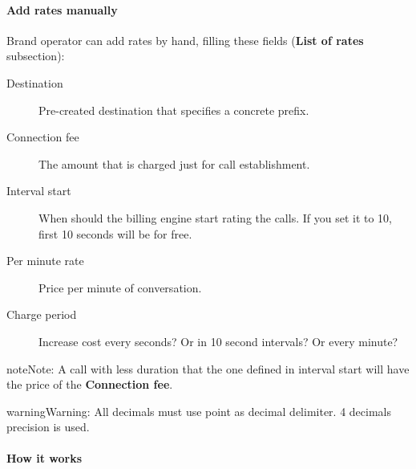 \documentclass[letterpaper,10pt,english]{sphinxmanual}
\begin{document}
\paragraph{Add rates manually}
\label{administration_portal/brand/billing/destination_rates:add-rates-manually}
Brand operator can add rates by hand, filling these fields (\textbf{List of rates} subsection):
\begin{description}
\item[{Destination}] \leavevmode{}\label{administration_portal/brand/billing/destination_rates:term-destination}
Pre-created destination that specifies a concrete prefix.

\item[{Connection fee}] \leavevmode{}\label{administration_portal/brand/billing/destination_rates:term-connection-fee}
The amount that is charged just for call establishment.

\item[{Interval start}] \leavevmode{}\label{administration_portal/brand/billing/destination_rates:term-interval-start}
When should the billing engine start rating the calls. If you set it to 10, first 10 seconds will be for free.

\item[{Per minute rate}] \leavevmode{}\label{administration_portal/brand/billing/destination_rates:term-per-minute-rate}
Price per minute of conversation.

\item[{Charge period}] \leavevmode{}\label{administration_portal/brand/billing/destination_rates:term-charge-period}
Increase cost every seconds? Or in 10 second intervals? Or every minute?

\end{description}

\begin{notice}{note}{Note:}
A call with less duration that the one defined in interval start will have the price of the \textbf{Connection fee}.
\end{notice}

\begin{notice}{warning}{Warning:}
All decimals must use point as decimal delimiter. 4 decimals precision is used.
\end{notice}
\paragraph{How it works}
\end{document}

